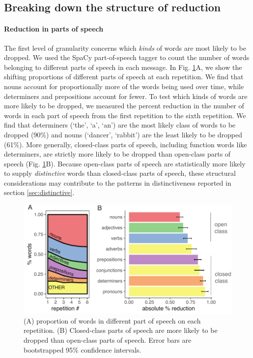 \documentclass[alpha-refs]{wiley-article}
\begin{document}
\subsection{Breaking down the structure of reduction}\label{reduction}

\paragraph{Reduction in parts of speech}


The first level of granularity concerns which \emph{kinds} of words are most likely to be dropped. 
We used the SpaCy part-of-speech tagger \citep{spacy2} to count the number of words belonging to different parts of speech in each message.
In Fig. \ref{fig:pos}A, we show the shifting proportions of different parts of speech at each repetition.
We find that nouns account for proportionally more of the words being used over time, while determiners and prepositions account for fewer.
To test which kinds of words are more likely to be dropped, we measured the percent reduction in the number of words in each part of speech from the first repetition to the sixth repetition. 
We find that determiners (`the', `a', `an') are the most likely class of words to be dropped (90\%) and nouns (`dancer', `rabbit') are the least likely to be dropped (61\%). %
More generally, closed-class parts of speech, including function words like determiners, are strictly more likely to be dropped than open-class parts of speech (Fig. \ref{fig:pos}B).
Because open-class parts of speech are statistically more likely to supply \emph{distinctive} words than closed-class parts of speech, these structural considerations may contribute to the patterns in distinctiveness reported in section \ref{sec:distinctive}.


\begin{figure}[t!]
\centering
\includegraphics[scale=.8]{posResults.pdf}
\caption{(A) proportion of words in different part of speech on each repetition. (B) Closed-class parts of speech are more likely to be dropped than open-class parts of speech. Error bars are bootstrapped 95\% confidence intervals.} 
\label{fig:pos}
\end{figure}
\end{document}
